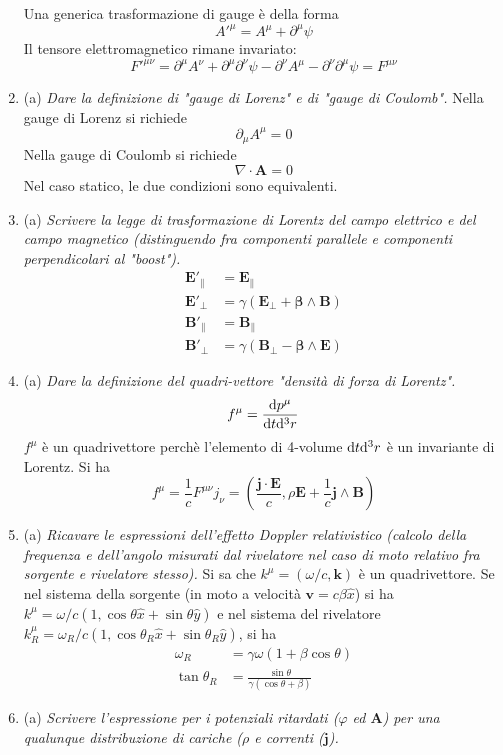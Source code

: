\documentclass{article}
\renewcommand{\a}{(a)}
\renewcommand{\t}[1]{\textit{ #1}}
\renewcommand{\vec}[1]{\mathbf{#1}}
\begin{document}
\begin{enumerate}
	Una generica trasformazione di gauge è della forma
	\[A'^\mu=A^\mu+\partial^\mu\psi\]
	Il tensore elettromagnetico rimane invariato:
	\[F'^{\mu\nu}=\partial^{\mu}A^{\nu}+\partial^{\mu}\partial^\nu\psi-\partial^\nu A^\mu-\partial^{\nu}\partial^\mu\psi=F^{\mu\nu}\]
	\item\a\t{Dare la definizione di "gauge di Lorenz" e di "gauge di Coulomb".}
	Nella gauge di Lorenz si richiede
	\[\partial_\mu A^\mu=0\]
	Nella gauge di Coulomb si richiede
	\[\nabla\cdot\vec{A}=0\]
	Nel caso statico, le due condizioni sono equivalenti.
	\item\a\t{Scrivere la legge di trasformazione di Lorentz del campo elettrico e del campo
		magnetico (distinguendo fra componenti parallele e componenti perpendicolari al
		"boost").}
	\begin{align*}
		\vec{E}'_\parallel&=\vec{E}_\parallel\\
		\vec{E}'_\perp&=\gamma(\vec{E}_\perp+\bm{\beta}\wedge\vec{B})\\
		\vec{B}'_\parallel&=\vec{B}_\parallel\\
		\vec{B}'_\perp&=\gamma(\vec{B}_\perp-\bm{\beta}\wedge\vec{E})		
	\end{align*}
	\item\a\t{Dare la definizione del quadri-vettore "densità di forza di Lorentz".}
	\[f^{\mu}=\frac{\mathrm{d} p^\mu}{\mathrm{d} t\mathrm{d}^3r}\]
	$f^\mu$ è un quadrivettore perchè l'elemento di 4-volume $\mathrm{d} t\mathrm{d}^3r$ è un invariante di Lorentz. Si ha
	\[f^\mu=\frac{1}{c}F^{\mu\nu}j_\nu=\left(\frac{\vec{j}\cdot\vec{E}}{c},\rho\vec{E}+\frac{1}{c}\vec{j}\wedge\vec{B}\right)\]
	\item\a\t{Ricavare le espressioni dell’effetto Doppler relativistico (calcolo della frequenza e
		dell’angolo misurati dal rivelatore nel caso di moto relativo fra sorgente e
		rivelatore stesso).} Si sa che $k^\mu=\left(\omega/{c},\vec{k}\right)$ è un quadrivettore. Se nel sistema della sorgente (in moto a velocità $\vec{v}=c\beta\hat{x}$) si ha $k^\mu=\omega/c(1,\cos\theta\hat{x}+\sin\theta\hat{y})$ e nel sistema del rivelatore $k_R^\mu=\omega_R/c(1,\cos\theta_R\hat{x}+\sin\theta_R\hat{y})$, si ha
		\begin{align*}
			\omega_R&=\gamma\omega(1+\beta\cos\theta)\\
			\tan\theta_R&=\frac{\sin\theta}{\gamma(\cos\theta+\beta)}
		\end{align*}
	\item\a\t{Scrivere l’espressione per i potenziali ritardati ($\varphi$ ed $\vec{A}$) per una qualunque
		distribuzione di cariche ($\rho$ e correnti ($\vec{j}$).}

\end{enumerate}
\end{document}
